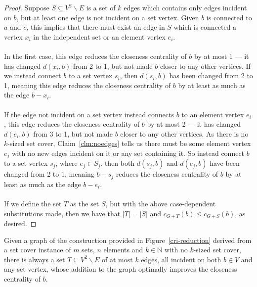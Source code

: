 \begin{proof}
    Suppose $S\subseteq V^2\backslash E$ is a set of $k$ edges which  contains only edges incident on $b$, but at least one edge is not incident on a set vertex. Given $b$ is connected to $a$ and $c$, this implies that there must exist an edge in $S$ which is connected a vertex $x_i$ in the independent set or an element vertex $e_i$. \\\\
    In the first case, this edge reduces the closeness centrality of $b$ by at most 1 --- it has changed $d(x_i,b)$ from 2 to 1, but not made $b$ closer to any other vertices. If we instead connect $b$ to a set vertex $s_i$, then $d(s_i,b)$ has been changed from 2 to 1, meaning this edge reduces the closeness centrality of $b$ by at least as much as the edge $b-x_i$. \\\\
    If the edge not incident on a set vertex instead connects $b$ to an element vertex $e_i$, this edge reduces the closeness centrality of $b$ by at most 2 --- it has changed $d(e_i,b)$ from 3 to 1, but not made $b$ closer to any other vertices. As there is no $k$-sized set cover, Claim~\ref{clm:noedges} tells us there must be some element vertex $e_j$ with no new edges incident on it or any set containing it. So instead connect $b$ to a set vertex $s_j$, where $e_j\in S_j$. then both $d(s_j,b)$ and $d(e_j,b)$ have been changed from 2 to 1, meaning $b-s_j$ reduces the closeness centrality of $b$ by at least as much as the edge $b-e_i$. \\\\ 
    If we define the set $T$ as the set $S$, but with the above case-dependent substitutions made, then we have that $|T|=|S|$ and $c_{G+T}(b)\leq c_{G+S}(b)$, as desired.
\end{proof}

\begin{lemma} \label{lem:set-incident}
    Given a graph of the construction provided in Figure~\ref{cri-reduction} derived from a set cover instance of $m$ sets, $n$ elements and $k\in\mathbb{N}$ with no $k$-sized set cover, there is always a set $T\subseteq V^2\backslash E$ of at most $k$ edges, all incident on both $b\in V$ and any set vertex, whose addition to the graph optimally improves the closeness centrality of $b$.
\end{lemma}

